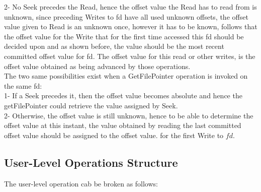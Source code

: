 \documentclass[a4paper, 11pt]{article}
\begin{document}
2- No Seek precedes the Read, hence the offset value the Read has to read from is unknown, since preceding Writes to fd have all used unknown offsets, the offset value given to Read is an unknown once, however it has to be known, follows that the offset value for the Write that for the first time accessed this fd should be decided upon and as shown before, the value should be the most recent committed offset value for fd. The offset value for this read or other writes, is the offset value obtained as being advanced by those operations.\\  

The two same possibilities exist when a GetFilePointer operation is invoked on the same fd:\\

1- If a Seek precedes it, then the offset value becomes absolute and hence the getFilePointer could retrieve the value assigned by Seek.\\

2- Otherwise, the offset value is still unknown, hence to be able to determine the offset value at this instant, the value obtained by reading the last committed offset value should be assigned to the offset value. for the first Write to $fd$.\\






\subsection{User-Level Operations Structure}

The user-level operation cab be broken as follows:\\
\end{document}
